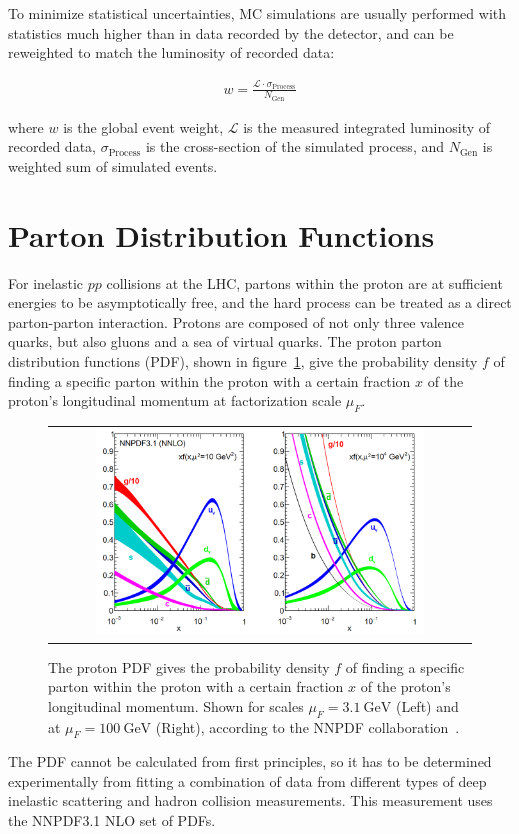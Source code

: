 To minimize statistical uncertainties, MC simulations are usually performed with statistics much higher than in data recorded by the detector, and can be reweighted to match the luminosity of recorded data:
\begin{linenomath*}
\begin{align}
w = \frac{\mathcal{L} \cdot \sigma_{\text{Process}}}{N_{\text{Gen}}}
\end{align}
\end{linenomath*}
where $w$ is the global event weight, $\mathcal{L}$ is the measured integrated luminosity of recorded data, $\sigma_{\text{Process}}$ is the cross-section of the simulated process, and $N_{\text{Gen}}$ is weighted sum of simulated events.

\section{Parton Distribution Functions}
\label{sec:Parton_Distribution_Functions}
For inelastic $pp$ collisions at the LHC, partons within the proton are at sufficient energies to be asymptotically free, and the hard process can be treated as a direct parton-parton interaction.
Protons are composed of not only three valence quarks, but also gluons and a sea of virtual quarks.
The proton parton distribution functions (PDF), shown in figure~\ref{Parton_Distribution_Functions}, give the probability density $f$ of finding a specific parton within the proton with a certain fraction $x$ of the proton's longitudinal momentum at factorization scale $\mu_F$.
\begin{figure}[!htb]
  \begin{center}
    \begin{tabular}{c}
        \includegraphics[width=0.80\textwidth]{fig_Event_Simulation/Parton_Distribution_Functions.png}
    \end{tabular}
    \caption{The proton PDF gives the probability density $f$ of finding a specific parton within the proton with a certain fraction $x$ of the proton's longitudinal momentum.
    Shown for scales $\mu_F = \SI{3.1}{\GeV}$ (Left) and at $\mu_F = \SI{100}{\GeV}$ (Right), according to the NNPDF collaboration~\cite{Ball:2267455}.
            }
    \label{Parton_Distribution_Functions}
  \end{center}
\end{figure}
The PDF cannot be calculated from first principles, so it has to be determined experimentally from fitting a combination of data from different types of deep inelastic scattering and hadron collision measurements.
This measurement uses the NNPDF3.1 NLO set of PDFs.

